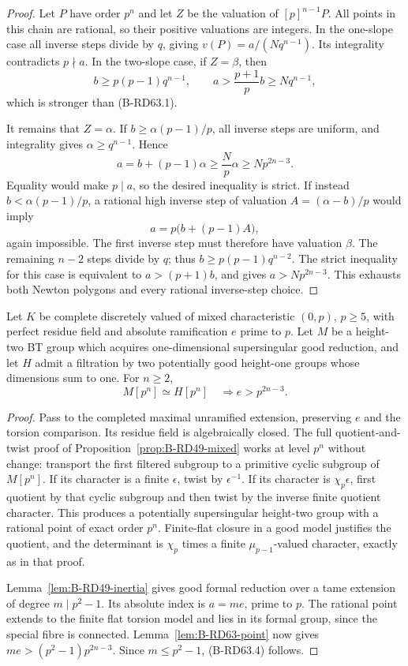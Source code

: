 \begin{proof}
Let $P$ have order $p^n$ and let $Z$ be the valuation of
$[p]^{n-1}P$. All points in this chain are rational, so their
positive valuations are integers. In the one-slope case all
inverse steps divide by $q$, giving
$v(P)=a/(Nq^{n-1})$. Its integrality contradicts $p\nmid a$.
In the two-slope case, if $Z=\beta$, then
\[
 b\ge p(p-1)q^{n-1},\qquad
 a>\frac{p+1}{p}b\ge Nq^{n-1},
\]
which is stronger than (B-RD63.1).

It remains that $Z=\alpha$. If $b\ge\alpha(p-1)/p$, all inverse
steps are uniform, and integrality gives $\alpha\ge q^{n-1}$.
Hence
\[
 a=b+(p-1)\alpha\ge\frac{N}{p}\alpha
       \ge Np^{2n-3}.
\]
Equality would make $p\mid a$, so the desired inequality is strict.
If instead $b<\alpha(p-1)/p$, a rational high inverse step of
valuation $A=(\alpha-b)/p$ would imply
\[
                   a=p\bigl(b+(p-1)A\bigr),
\]
again impossible. The first inverse step must therefore have
valuation $\beta$. The remaining $n-2$ steps divide by $q$;
thus $b\ge p(p-1)q^{n-2}$. The strict inequality for this case
is equivalent to $a>(p+1)b$, and gives
$a>Np^{2n-3}$. This exhausts both Newton polygons and every
rational inverse-step choice.
\end{proof}

\begin{proposition}
\label{prop:B-RD63-mixed}
Let $K$ be complete discretely valued of mixed characteristic
$(0,p)$, $p\ge5$, with perfect residue field and absolute
ramification $e$ prime to $p$. Let $M$ be a height-two BT group
which acquires one-dimensional supersingular good reduction,
and let $H$ admit a filtration by two potentially good height-one
groups whose dimensions sum to one. For $n\ge2$,
\[
              M[p^n]\simeq H[p^n]\quad\Longrightarrow
                         e>p^{2n-3}.                   \tag{B-RD63.4}
\]
\end{proposition}
\begin{proof}
Pass to the completed maximal unramified extension, preserving
$e$ and the torsion comparison. Its residue field is algebraically
closed. The full quotient-and-twist proof of
Proposition~\ref{prop:B-RD49-mixed} works at level $p^n$ without
change: transport the first filtered subgroup to a primitive
cyclic subgroup of $M[p^n]$. If its character is a finite
$\epsilon$, twist by $\epsilon^{-1}$. If its character is
$\chi_p\epsilon$, first quotient by that cyclic subgroup and
then twist by the inverse finite quotient character. This produces
a potentially supersingular height-two group with a rational
point of exact order $p^n$. Finite-flat closure in a good model
justifies the quotient, and the determinant is $\chi_p$ times
a finite $\mu_{p-1}$-valued character, exactly as in that proof.

Lemma~\ref{lem:B-RD49-inertia} gives good formal reduction over
a tame extension of degree $m\mid p^2-1$. Its absolute index is
$a=me$, prime to $p$. The rational point extends to the finite
flat torsion model and lies in its formal group, since the special
fibre is connected. Lemma~\ref{lem:B-RD63-point} now gives
$me>(p^2-1)p^{2n-3}$. Since $m\le p^2-1$, (B-RD63.4) follows.
\end{proof}


